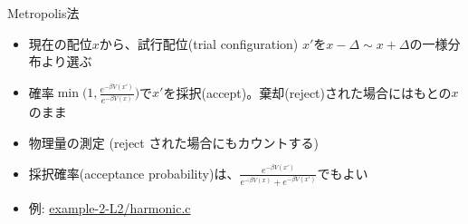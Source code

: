 \begin{frame}[t,fragile]{Metropolis法}
  \begin{itemize}
    \setlength{\itemsep}{1em}
  \item 現在の配位$x$から、試行配位(trial configuration) $x'$を$x - \Delta \sim x + \Delta$の一様分布より選ぶ
  \item 確率$\min \Big( 1, \frac{e^{-\beta V(x')}}{e^{-\beta V(x)}} \Big)$で$x'$を採択(accept)。棄却(reject)された場合にはもとの$x$のまま
  \item 物理量の測定 (reject された場合にもカウントする)
  \item 採択確率(acceptance probability)は、$\frac{e^{-\beta V(x')}}{e^{-\beta V(x)}+e^{-\beta V(x')}}$でもよい
  \item 例: \href{https://github.com/todo-group/computer-experiments/blob/master/exercise/monte_carlo/harmonic.c}{example-2-L2/harmonic.c}
  \end{itemize}
\end{frame}
